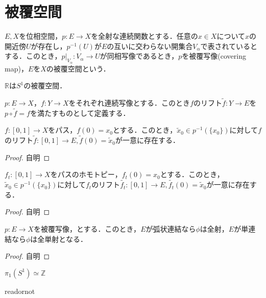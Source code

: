\documentclass[uplatex]{jsarticle}
\renewcommand{\restriction}[2]{\left. #1 \right|_{#2}}
\begin{document}
\fi

\section{被覆空間}
\begin{teigi}[被覆空間]
  $E,X$を位相空間，$p\colon E \to X$を全射な連続関数とする．任意の$x\in X$について$x$の開近傍$U$が存在し，$p^{-1}(U)$が$E$の互いに交わらない開集合$V_\alpha$で表されているとする．このとき，$\restriction{p}{V_\alpha} \colon V_\alpha \to U$が同相写像であるとき，$p$を被覆写像(covering map)，$E$を$X$の被覆空間という．
\end{teigi}

\begin{rei}
  $\mathbb{R}$は$S^1$の被覆空間．
\end{rei}

\begin{teigi}[リフト]
  $p\colon E\to X$，$f\colon Y\to X$をそれぞれ連続写像とする．このとき$f$のリフト$\tilde{f}\colon Y\to E$を$p\circ \tilde{f} = f$を満たすものとして定義する．
\end{teigi}

\begin{teiri}
  $f\colon \left[0,1\right]\to X$をパス，$f(0)=x_0$とする．このとき，$\tilde{x}_0 \in p^{-1}(\{x_0\})$に対して$f$のリフト$\tilde{f}\colon \left[0,1\right]\to E,\tilde{f}(0)=\tilde{x}_0$が一意に存在する．
\end{teiri}
\begin{proof}
  自明
\end{proof}

\begin{teiri}
  $f_t \colon \left[0,1\right]\to X$をパスのホモトピー，$f_t(0)=x_0$とする．このとき，$\tilde{x}_0 \in p^{-1}(\{x_0\})$に対して$f_t$のリフト$\tilde{f_t}\colon \left[0,1\right]\to E,\tilde{f_t}(0)=\tilde{x}_0$が一意に存在する．
\end{teiri}
\begin{proof}
  自明
\end{proof}
\begin{teiri}
  $p\colon E\to X$を被覆写像，とする．このとき，$E$が弧状連結なら$\phi$は全射，$E$が単連結なら$\phi$は全単射となる．
\end{teiri}
\begin{proof}
  自明
\end{proof}
\begin{teiri}
  $\pi_1(S^1) \simeq \mathbb{Z}$
\end{teiri}

\expandafter\ifx\csname readornot\endcsname\relax
  
\end{document}
